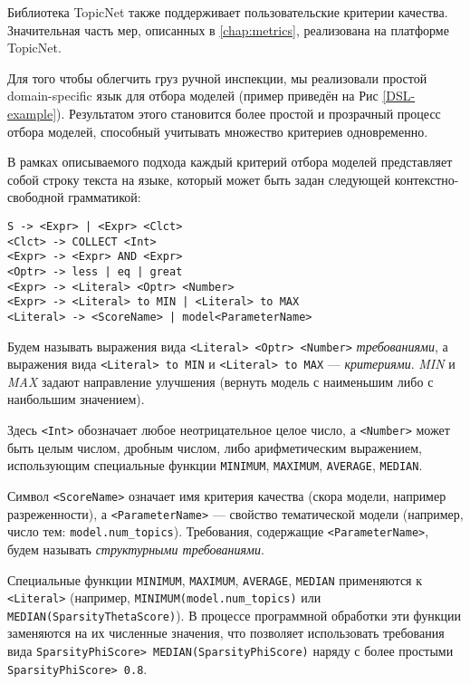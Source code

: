 Библиотека TopicNet также поддерживает пользовательские критерии качества. Значительная часть мер, описанных в \ref{chap:metrics}, реализована на платформе TopicNet.

Для того чтобы облегчить груз ручной инспекции, мы реализовали простой domain-specific язык для отбора моделей (пример приведён на Рис \ref{DSL-example}). Результатом этого становится более простой и прозрачный процесс отбора моделей, способный учитывать множество критериев одновременно.

В рамках описываемого подхода каждый критерий отбора моделей представляет собой строку текста на языке, который может быть задан следующей контекстно-свободной грамматикой:

\begin{lstlisting}
S -> <Expr> | <Expr> <Clct>
<Clct> -> COLLECT <Int>
<Expr> -> <Expr> AND <Expr>
<Optr> -> less | eq | great
<Expr> -> <Literal> <Optr> <Number>
<Expr> -> <Literal> to MIN | <Literal> to MAX
<Literal> -> <ScoreName> | model<ParameterName>
\end{lstlisting}

Будем называть выражения вида 
\lstinline{<Literal> <Optr> <Number>} \textit{требованиями}, а выражения вида \lstinline{<Literal> to MIN} и \lstinline{<Literal> to MAX} --- \textit{критериями}. \textit{MIN} и \textit{MAX} задают направление улучшения (вернуть модель с наименьшим либо с наибольшим значением).

Здесь \lstinline{<Int>} обозначает любое неотрицательное целое число, а \lstinline{<Number>} может быть целым числом, дробным числом, либо арифметическим выражением, использующим специальные функции \texttt{MINIMUM}, \texttt{MAXIMUM}, \texttt{AVERAGE}, \texttt{MEDIAN}. 

Символ \lstinline{<ScoreName>} означает имя критерия качества (скора модели, например разреженности), а \lstinline{<ParameterName>} --- свойство тематической модели (например, число тем: \texttt{model.num\_topics}). Требования, содержащие \lstinline{<ParameterName>}, будем называть \textit{структурными требованиями}.

Специальные функции \texttt{MINIMUM}, \texttt{MAXIMUM}, \texttt{AVERAGE}, \texttt{MEDIAN} применяются к \lstinline{<Literal>} (например, \texttt{MINIMUM(model.num\_topics)} или \texttt{MEDIAN(SparsityThetaScore)}). В процессе программной обработки эти функции заменяются на их численные значения, что позволяет использовать требования вида \texttt{SparsityPhiScore\@word > MEDIAN(SparsityPhiScore\@word)} наряду с более простыми \texttt{SparsityPhiScore\@word > 0.8}. 

